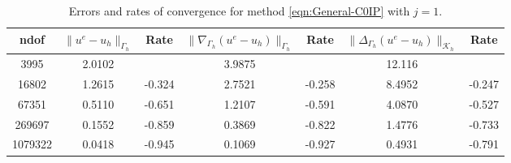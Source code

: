 \documentclass[10pt, a4paper]{amsart}
\newcommand{\nab}{\nabla}
\newcommand{\calK}{\mathcal{K}}
\theoremstyle{definition}
\theoremstyle{remark}
\theoremstyle{example}
\numberwithin{equation}{section}
\begin{document}
\begin{table}[h]
\centering
\caption{\label{tab:MethodJ1}Errors and rates of convergence for method \eqref{eqn:General-C0IP} with $j=1$. }
\begin{tabular}{c c c c c c c}
\hline
 ndof & $\|u^e - u_{h}\|_{\Gamma_{h}}$ & Rate  &$\|\nab_{\Gamma_h}(u^e - u_h)\|_{\Gamma_h}$ & Rate &$\|\Delta_{\Gamma_h}(u^e - u_h)\|_{\calK_h}$ & Rate \\
\hline
3995	&2.0102	&	     &3.9875	&	&12.116	&\\
16802	&1.2615	&-0.324	&2.7521	&-0.258	&8.4952	&-0.247\\
67351	&0.5110	&-0.651	&1.2107	&-0.591	&4.0870	&-0.527\\
269697	&0.1552	&-0.859	&0.3869	&-0.822	&1.4776	&-0.733\\
1079322	&0.0418	&-0.945	&0.1069	&-0.927	&0.4931	&-0.791
\end{tabular}
\end{table}
\end{document}
